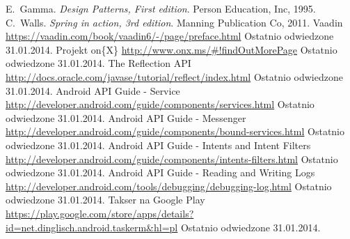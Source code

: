 \documentclass[11pt,a4paper,polish,thesis]{dcsbook}
\begin{document}
\begin{thebibliography}{1}
E.~Gamma. \emph{Design Patterns, First edition}. Person Education, Inc, 1995.
C.~Walls. \emph{Spring in action, 3rd edition}. Manning Publication Co, 2011.
Vaadin \url{https://vaadin.com/book/vaadin6/-/page/preface.html} Ostatnio odwiedzone 31.01.2014.
Projekt on\{X\} \url{http://www.onx.ms/#!findOutMorePage} Ostatnio odwiedzone 31.01.2014.
The Reflection API  \url{http://docs.oracle.com/javase/tutorial/reflect/index.html} Ostatnio odwiedzone 31.01.2014.
 Android API Guide - Service \url{http://developer.android.com/guide/components/services.html} Ostatnio odwiedzone 31.01.2014.
 Android API Guide - Messenger \url{http://developer.android.com/guide/components/bound-services.html} Ostatnio odwiedzone 31.01.2014.
 Android API Guide - Intents and Intent Filters \url{http://developer.android.com/guide/components/intents-filters.html} Ostatnio odwiedzone 31.01.2014.
 Android API Guide - Reading and Writing Logs \url{http://developer.android.com/tools/debugging/debugging-log.html} Ostatnio odwiedzone 31.01.2014.
Takser na Google Play \url{https://play.google.com/store/apps/details?id=net.dinglisch.android.taskerm&hl=pl} Ostatnio odwiedzone 31.01.2014.
\end{thebibliography}
\end{document}
